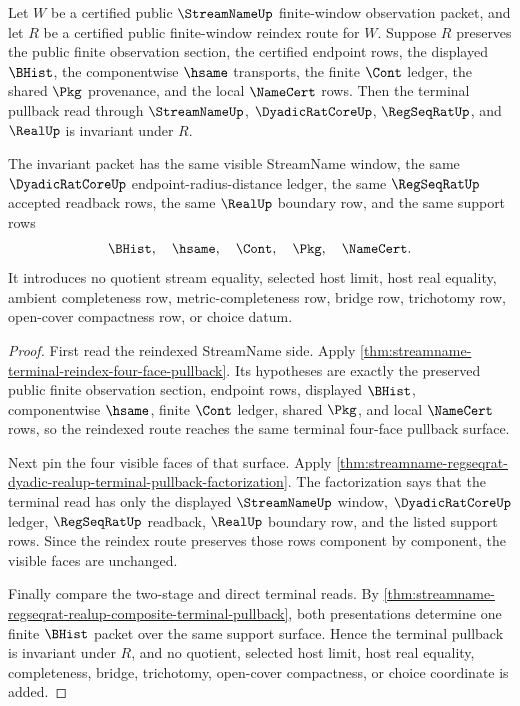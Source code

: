\begin{theorem}
\label{thm:streamname-terminal-reindex-pullback-invariance}
Let $W$ be a certified public $\StreamNameUp$ finite-window observation
packet, and let $R$ be a certified public finite-window reindex route for
$W$. Suppose $R$ preserves the public finite observation section, the certified
endpoint rows, the displayed $\BHist$, the componentwise $\hsame$ transports,
the finite $\Cont$ ledger, the shared $\Pkg$ provenance, and the local
$\NameCert$ rows. Then the terminal pullback read through
$\StreamNameUp$, $\DyadicRatCoreUp$, $\RegSeqRatUp$, and $\RealUp$ is
invariant under $R$.

The invariant packet has the same visible StreamName window, the same
$\DyadicRatCoreUp$ endpoint-radius-distance ledger, the same $\RegSeqRatUp$
accepted readback rows, the same $\RealUp$ boundary row, and the same support
rows
$$
\BHist,\quad \hsame,\quad \Cont,\quad \Pkg,\quad \NameCert.
$$
It introduces no quotient stream equality, selected host limit, host real
equality, ambient completeness row, metric-completeness row, bridge row,
trichotomy row, open-cover compactness row, or choice datum.
\end{theorem}
\begin{proof}
First read the reindexed StreamName side. Apply
\autoref{thm:streamname-terminal-reindex-four-face-pullback}. Its hypotheses
are exactly the preserved public finite observation section, endpoint rows,
displayed $\BHist$, componentwise $\hsame$, finite $\Cont$ ledger, shared
$\Pkg$, and local $\NameCert$ rows, so the reindexed route reaches the same
terminal four-face pullback surface.

Next pin the four visible faces of that surface. Apply
\autoref{thm:streamname-regseqrat-dyadic-realup-terminal-pullback-factorization}.
The factorization says that the terminal read has only the displayed
$\StreamNameUp$ window, $\DyadicRatCoreUp$ ledger, $\RegSeqRatUp$ readback,
$\RealUp$ boundary row, and the listed support rows. Since the reindex route
preserves those rows component by component, the visible faces are unchanged.

Finally compare the two-stage and direct terminal reads. By
\autoref{thm:streamname-regseqrat-realup-composite-terminal-pullback}, both
presentations determine one finite $\BHist$ packet over the same support
surface. Hence the terminal pullback is invariant under $R$, and no quotient,
selected host limit, host real equality, completeness, bridge, trichotomy,
open-cover compactness, or choice coordinate is added.
\end{proof}

